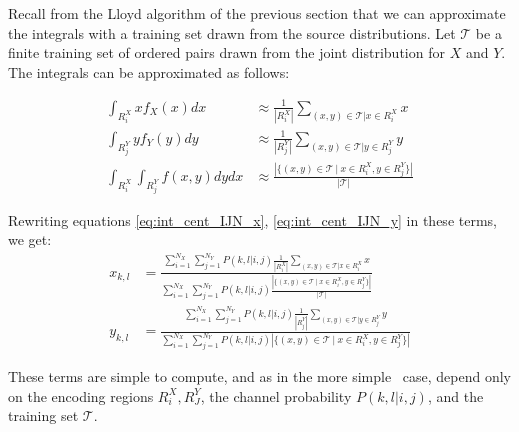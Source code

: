 Recall from the Lloyd algorithm of the previous section that we can approximate the integrals with a training set drawn from the source distributions. Let $\mathcal T$ be a finite training set of ordered pairs drawn from the joint distribution for $X$ and $Y$. The integrals can be approximated as follows:

\begin{align}
    \int_{R_i^X}xf_X(x)dx&\approx
        \frac{1}{|R_i^X|}\sum_{(x,y)\in \mathcal T|x\in R_i^X}x\\
    \int_{R_j^Y}yf_Y(y)dy&\approx
        \frac{1}{|R_j^Y|}\sum_{(x,y)\in \mathcal T|y\in R_j^Y}y\\
    \int_{R_i^X}\int_{R_j^Y}f(x,y)dydx&\approx 
        \frac{\left|\{(x,y)\in \mathcal T\ |\ x\in R_i^X, y\in R_j^Y\}\right|
        }{
        |\mathcal T|
        }
\end{align}

Rewriting equations \eqref{eq:int_cent_IJN_x}, \eqref{eq:int_cent_IJN_y} in these terms, we get:
\begin{align}
    \label{eq:comp_cent_IJN_x}
    x_{k,l}
    &= \frac{
        \sum_{i=1}^{N_X}\sum_{j=1}^{N_Y}
            P(k,l|i,j)\frac{1}{|R_i^X|}\sum_{(x,y)\in \mathcal T|x\in R_i^X}x
    }{
        \sum_{i=1}^{N_X}\sum_{j=1}^{N_Y}
            P(k,l|i,j)
            \frac{\left|\{(x,y)\in \mathcal T\ |\ x\in R_i^X, y\in R_j^Y\}\right|}{|\mathcal T|}
    }\\
    \label{eq:comp_cent_IJN_y}
    y_{k,l}
    &= \frac{
        \sum_{i=1}^{N_X}\sum_{j=1}^{N_Y}
            P(k,l|i,j)\frac{1}{|R_j^Y|}\sum_{(x,y)\in \mathcal T|y\in R_j^Y}y
    }{
        \sum_{i=1}^{N_X}\sum_{j=1}^{N_Y}
            P(k,l|i,j)
            \left|\{(x,y)\in \mathcal T\ |\ x\in R_i^X, y\in R_j^Y\}\right|
    }
\end{align}

These terms are simple to compute, and as in the more simple \sysJJN\ case, depend only on the encoding regions $R_i^X, R_J^Y$, the channel probability $P(k,l|i,j)$, and the training set $\mathcal T$.


